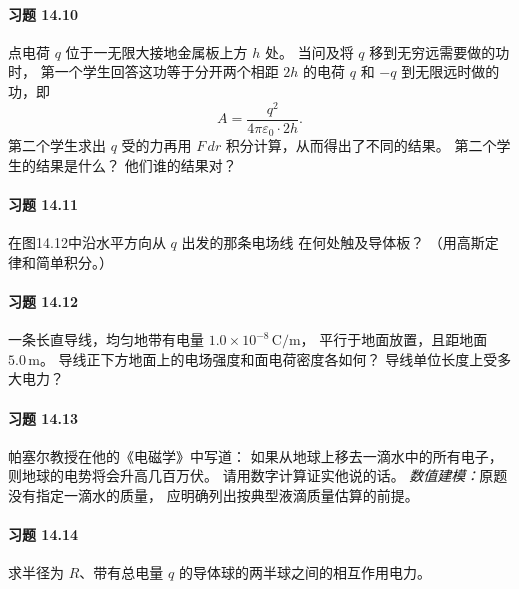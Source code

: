 \paragraph{习题 14.10}
点电荷 \(q\) 位于一无限大接地金属板上方
\(h\) 处。
当问及将 \(q\) 移到无穷远需要做的功时，
第一个学生回答这功等于分开两个相距
\(2h\) 的电荷 \(q\) 和 \(-q\)
到无限远时做的功，即
\[
 A=\frac{q^2}{4\pi\varepsilon_0\cdot2h}.
\]
第二个学生求出 \(q\) 受的力再用
\(F\,dr\) 积分计算，从而得出了不同的结果。
第二个学生的结果是什么？
他们谁的结果对？

\paragraph{习题 14.11}
在图14.12中沿水平方向从 \(q\) 出发的那条电场线
在何处触及导体板？
（用高斯定律和简单积分。）

\paragraph{习题 14.12}
一条长直导线，均匀地带有电量
\(1.0\times10^{-8}\,\mathrm{C/m}\)，
平行于地面放置，且距地面
\(5.0\,\mathrm m\)。
导线正下方地面上的电场强度和面电荷密度各如何？
导线单位长度上受多大电力？

\paragraph{习题 14.13}
帕塞尔教授在他的《电磁学》中写道：
如果从地球上移去一滴水中的所有电子，
则地球的电势将会升高几百万伏。
请用数字计算证实他说的话。
\textit{数值建模：}原题没有指定一滴水的质量，
应明确列出按典型液滴质量估算的前提。

\paragraph{习题 14.14}
求半径为 \(R\)、带有总电量 \(q\)
的导体球的两半球之间的相互作用电力。
